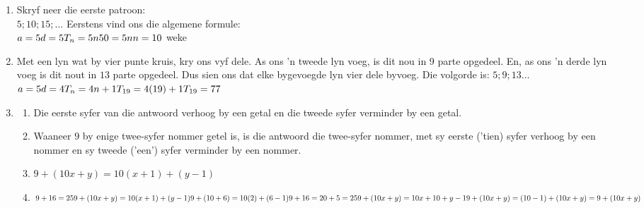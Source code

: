 \begin{eocsolutions}{}
{\begin{enumerate}[itemsep=5pt, label=\textbf{\arabic*}. ]
\begin{enumerate}[noitemsep, label=\textbf{(\alph*)} ]
  \item Die eerste term $4$ omdat dit die nommer vuurhoutjies wat vir een vierhoek nodig is.
  \item Die konstante verskil tussen die terme is $3$. ($7 -4 = 3$ ; $10 - 7 = 3$)
  \item 
$%
T_n = 3n + 1$
  \item $T_25 = 3(25) + 1 \\
= 76$
  \end{enumerate}   
\item Skryf neer die eerste patroon:\\
$5 ; 10 ; 15 ; \ldots$
Eerstens vind ons die algemene formule:\\
$a = 5\\
d = 5\\
T_n = 5n  \\
50 = 5n \\
n = 10 $ weke
\item Met een lyn wat by vier punte kruis, kry ons vyf dele. As ons 'n tweede lyn voeg, is dit nou in 9 parte opgedeel. En, as ons 'n derde lyn voeg is dit nout in $13$ parte opgedeel. Dus sien ons dat elke bygevoegde lyn vier dele byvoeg. Die volgorde is: $5 ; 9 ; 13 \ldots$\\
$a = 5\\
d = 4\\
T_n = 4n + 1  \\
T_{19} = 4(19) + 1 \\
T_{19} = 77 $
\item 
  \begin{enumerate}[noitemsep, label=\textbf{(\alph*)} ]
  \item Die eerste syfer van die antwoord verhoog by een getal en die tweede syfer verminder by een getal.
  \item Waaneer $9$ by enige twee-syfer nommer getel is, is die antwoord die twee-syfer nommer, met sy eerste ('tien) syfer verhoog by een nommer en sy tweede ('een') syfer verminder by een nommer.
  \item $9 + (10x + y) = 10(x+1)+(y-1)$
  \item $9 + 16 = 25\\
9 + (10x + y) = 10(x + 1) + (y-1)\\
9 + (10 + 6) = 10(2) + (6-1)\\
9 + 16 = 20 + 5 = 25\\
9 + (10x + y) = 10x + 10 + y - 1\\
9 + (10x + y) = (10 - 1) + (10x + y) 
= 9 + (10x + y)$
  \end{enumerate}
\end{enumerate}}
\end{eocsolutions}


